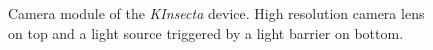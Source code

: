 \begin{figure}[!ht]
    \centering
    \begin{minipage}{\textwidth}
        \centering
        \caption{Camera module of the \textit{KInsecta} device. High resolution camera lens on top and a light source triggered by a light barrier on bottom.}
        \label{fig:camera}
    \end{minipage}
\end{figure}
